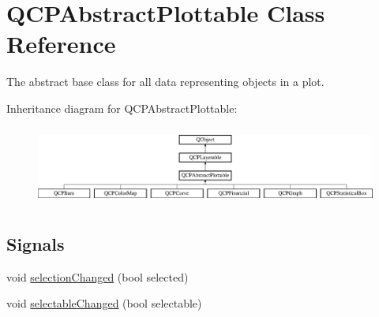 \hypertarget{classQCPAbstractPlottable}{}\section{Q\+C\+P\+Abstract\+Plottable Class Reference}
\label{classQCPAbstractPlottable}


The abstract base class for all data representing objects in a plot.  


Inheritance diagram for Q\+C\+P\+Abstract\+Plottable\+:\begin{figure}[H]
\begin{center}
\leavevmode
\includegraphics[height=2.629108cm]{classQCPAbstractPlottable}
\end{center}
\end{figure}
\subsection*{Signals}
\begin{DoxyCompactItemize}
\item 
void \hyperlink{classQCPAbstractPlottable_a3af66432b1dca93b28e00e78a8c7c1d9}{selection\+Changed} (bool selected)
\item 
void \hyperlink{classQCPAbstractPlottable_a0059caa3f3581f3959660fef8cbb71c4}{selectable\+Changed} (bool selectable)
\end{DoxyCompactItemize}
